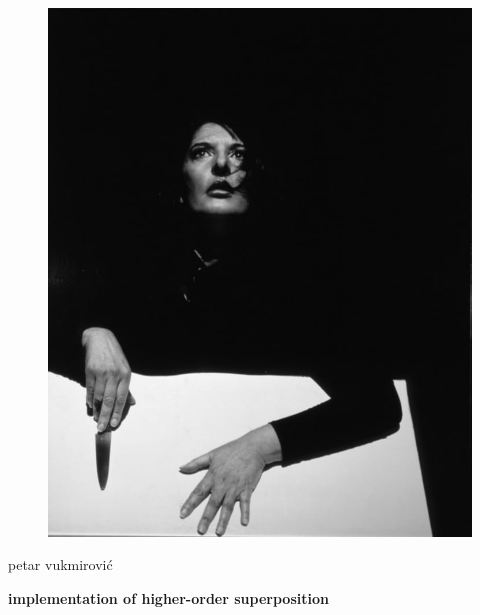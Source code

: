 
\thispagestyle{empty}
\addtocounter{page}{-1}


    \begin{figure}[t]
        \includegraphics[height=0.9\textwidth]{cover/rythm-10.jpg}
    \end{figure}
    
    \textsf{petar vukmirović} 

    \textsf{\textbf{implementation of higher-order superposition}}
